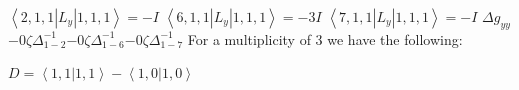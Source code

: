 \documentclass[11pt]{article}
\begin{document}
$\left\langle2,1,1\left|L_{y}\right|1,1,1\right\rangle=-I$\newline
$\left\langle6,1,1\left|L_{y}\right|1,1,1\right\rangle=-3I$\newline
$\left\langle7,1,1\left|L_{y}\right|1,1,1\right\rangle=-I$\newline
\newline$\Delta g_{yy}$\newline\newline$-0\zeta \Delta_{1-2}^{-1}$\newline$-0\zeta \Delta_{1-6}^{-1}$\newline$-0\zeta \Delta_{1-7}^{-1}$\newline\newline
\newline
For a multiplicity of 3 we have the following:\newline

$D=\left\langle1,1|1,1\right\rangle-\left\langle1,0|1,0\right\rangle$\newline
\end{document}
